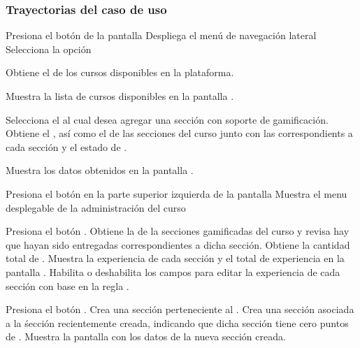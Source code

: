 \subsubsection{Trayectorias del caso de uso}

\begin{UCtrayectoria}%
%
  \Actor Presiona el botón \IUMenu de la pantalla 
  \Sistema Despliega el menú de navegación lateral
  \Actor Selecciona la opción 

  \Sistema Obtiene el  de los cursos disponibles en la
           plataforma.

  \Sistema Muestra la lista de cursos disponibles en la pantalla .

  \Actor Selecciona el  al cual desea agregar una sección con
         soporte de gamificación.
  \Sistema Obtiene el , 
           así como el  de las secciones 
           del curso junto con las  
           correspondients a cada sección y el estado de .

  \Sistema Muestra los datos obtenidos en la pantalla .
           \label{CU-E07-pantalla}

  \Actor Presiona el botón \IUAdminSitio en la parte superior izquierda de la pantalla
  \Sistema Muestra el menu desplegable de la administración del curso

  \Actor Presiona el botón . 
  \Sistema Obtiene la  de la secciones gamificadas del 
           curso y revisa hay  que hayan sido
           entregadas correspondientes a dicha sección.
  \Sistema Obtiene la cantidad total de .
  \Sistema Muestra la experiencia de cada sección y el total de experiencia 
           en la pantalla .
  \Sistema Habilita o deshabilita los campos para editar la experiencia de cada 
           sección con base en la regla .

  \Actor Presiona el botón .
  \Sistema Crea una sección  perteneciente al
           .
  \Sistema Crea una sección  asociada a la śección
           recientemente creada, indicando que dicha sección tiene cero puntos de
           .
  \Sistema Muestra la pantalla  con los datos de la nueva sección creada.
\end{UCtrayectoria}

